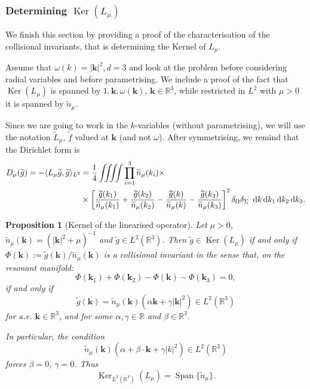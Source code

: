 \documentclass[reqno,11pt,letterpaper]{amsart}
\numberwithin{equation}{section}
\newcommand{\dd}{\, {\rm d}}
\newtheorem{proposition}{Proposition}[section]
\begin{document}
\subsubsection{Determining $\operatorname{Ker}(L_\mu)$}
We finish this section by providing a proof of the characterisation of the collisional invariants, that is determining the Kernel of $L_\mu$. 

Assume that $\omega(k) = |\textbf{k}|^2, d=3$ and look at the problem before considering radial variables and before parametrising. We include a proof of the fact that $\operatorname{Ker}(L_\mu)$ is spanned by $1, \textbf{k}, \omega(\textbf{k})$, $\textbf{k} \in \mathbb{R}^3$, while restricted in $L^2$ with $\mu>0$ it is spanned by $\widetilde{n}_\mu$. 

Since we are going to work in the $k$-variables (without parametrising), we will use the notation $\widetilde L_\mu $, $\widetilde f$ valued at $\textbf{k}$ (and not $\omega$). 
After symmetrising, we remind that  the Dirichlet form is 
\begin{align*}D_{\mu}(\widetilde g)= -\langle L_\mu \widetilde g, \widetilde g\rangle_{L^2} & =\frac{1}{4} \iiiint \prod_{i=1}^3 \widetilde n_\mu (k_i)\times \\
&\times \left[\frac{\widetilde g(k_1)}{\widetilde n_\mu(k_1)} + \frac{\widetilde g(k_2)}{\widetilde n_\mu(k_2)} - \frac{\widetilde g(k)}{\widetilde n_\mu(k)} - \frac{\widetilde g(k_3)}{\widetilde n_\mu(k_3)}\right]^2 \delta_\Omega \delta_\Sigma\  \dd k \dd k_1 \dd k_2 \dd k_3. 
\end{align*}

\begin{proposition}[Kernel of the linearised operator] \label{Prop:Kernel_L}
Let $\mu>0$, $\widetilde{n}_\mu(\textbf{k}) = (|\textbf{k}|^2 + \mu)^{-1}$ and $\widetilde{g} \in L^2(\mathbb{R}^3)$. Then $\widetilde{g} \in \operatorname{Ker}(L_\mu)$ if and only if $\Phi (\textbf{k}) := \widetilde{g}(\textbf{k})/\widetilde{n}_\mu(\textbf{k})$ is a collisional invariant in the sense that, on the resonant manifold: 
    $$\Phi(\textbf{k}_1) + \Phi(\textbf{k}_2) - \Phi(\textbf{k}) - \Phi(\textbf{k}_3)=0, $$
    if and only if  
    $$
    \widetilde{g}(\textbf{k})= \widetilde{n}_\mu(\textbf{k}) ( \alpha \textbf{k} + \gamma |\textbf{k}|^2 ) \in L^2(\mathbb{R}^3)$$ 
    for a.e. $\textbf{k} \in \mathbb{R}^3$, and for some $\alpha, \gamma \in \mathbb{R}$ and $\beta \in \mathbb{R}^3$.
    
    In particular, the condition
    $$\widetilde{n}_\mu(\textbf{k}) (\alpha+\beta\cdot \textbf{k} +\gamma|k|^2) \in L^2(\mathbb{R}^3) $$ forces
    $\beta=0$, $ \gamma=0$. Thus 
    $$ \operatorname{Ker}_{L^2(\mathbb{R}^3)}(L_\mu)=\operatorname{Span}\{\widetilde{n}_\mu\}.
    $$
\end{proposition}
\end{document}
